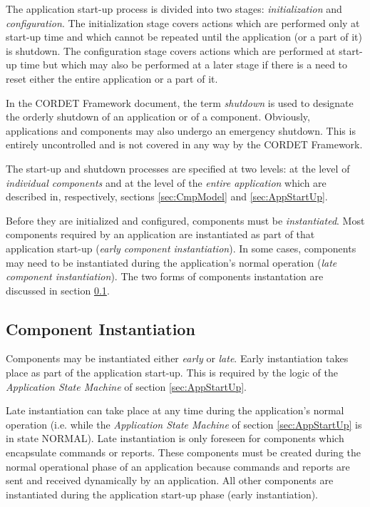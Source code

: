 \documentclass{pnp_article}
\begin{document}
The application start-up process is divided into two stages: \textit{initialization} and \textit{configuration}. The initialization stage covers actions which are performed only at start-up time and which cannot be repeated until the application (or a part of it) is shutdown. The configuration stage covers actions which are performed at start-up time but which may also be performed at a later stage if there is a need to reset either the entire application or a part of it. 

In the CORDET Framework document, the term \textit{shutdown} is used to designate the orderly shutdown of an application or of a component. Obviously, applications and components may also undergo an emergency shutdown. This is entirely uncontrolled and is not covered in any way by the CORDET Framework.

The start-up and shutdown processes are specified at two levels: at the level of \textit{individual components} and at the level of the \textit{entire application} which are described in, respectively, sections \ref{sec:CmpModel} and \ref{sec:AppStartUp}.

Before they are initialized and configured, components must be \textit{instantiated}. Most components required by an application are instantiated as part of that application start-up (\textit{early component instantiation}). In some cases, components may need to be instantiated during the application's normal operation (\textit{late component instantiation}). The two forms of components instantation are discussed in section \ref{sec:CmpInst}.

\subsection{Component Instantiation}\label{sec:CmpInst}
Components may be instantiated either \textit{early} or \textit{late}. Early instantiation takes place as part of the application start-up. This is required by the logic of the \textit{Application State Machine} of section \ref{sec:AppStartUp}.

Late instantiation can take place at any time during the application's normal operation (i.e. while the \textit{Application State Machine} of section \ref{sec:AppStartUp} is in state NORMAL). Late instantiation is only foreseen for components which encapsulate commands or reports. These components must be created during the normal operational phase of an application because commands and reports are sent and received dynamically by an application. All other components are instantiated during the application start-up phase (early instantiation).
\end{document}
